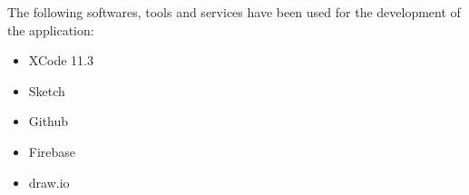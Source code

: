 The following softwares, tools and services have been used for the development of the application:
\vspace{5mm}
\begin{itemize}
\item XCode 11.3
\item Sketch
\item Github
\item Firebase
\item draw.io
\end{itemize}